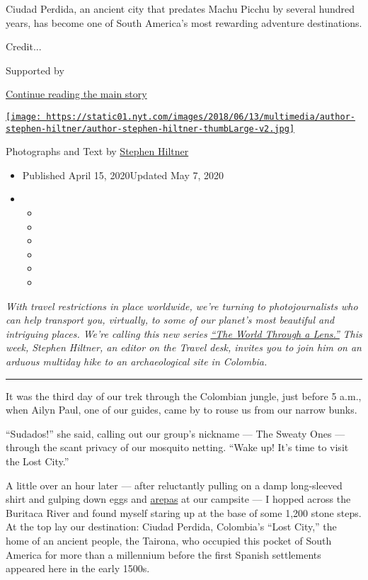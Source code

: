 Ciudad Perdida, an ancient city that predates Machu Picchu by several
hundred years, has become one of South America's most rewarding
adventure destinations.

Credit...

Supported by

\protect\hyperlink{after-sponsor}{Continue reading the main story}

\href{https://www.nytimes.com/by/stephen-hiltner}{\texttt{[image: https://static01.nyt.com/images/2018/06/13/multimedia/author-stephen-hiltner/author-stephen-hiltner-thumbLarge-v2.jpg]}}

Photographs and Text by
\href{https://www.nytimes.com/by/stephen-hiltner}{Stephen Hiltner}

\begin{itemize}
\item
  Published April 15, 2020Updated May 7, 2020
\item
  \begin{itemize}
  \item
  \item
  \item
  \item
  \item
  \item
  \end{itemize}
\end{itemize}

\emph{With travel restrictions in place worldwide, we're turning to
photojournalists who can help transport you, virtually, to some of our
planet's most beautiful and intriguing places. We're calling this new
series}
\href{https://www.nytimes.com/column/the-world-through-a-lens}{\emph{``The
World Through a Lens.''}} \emph{This week, Stephen Hiltner, an editor on
the Travel desk, invites you to join him on an arduous multiday hike to
an archaeological site in Colombia.}

\begin{center}\rule{0.5\linewidth}{\linethickness}\end{center}

It was the third day of our trek through the Colombian jungle, just
before 5 a.m., when Ailyn Paul, one of our guides, came by to rouse us
from our narrow bunks.

``Sudados!'' she said, calling out our group's nickname --- The Sweaty
Ones --- through the scant privacy of our mosquito netting. ``Wake up!
It's time to visit the Lost City.''

A little over an hour later --- after reluctantly pulling on a damp
long-sleeved shirt and gulping down eggs and
\href{https://cooking.nytimes.com/recipes/1015180-colombian-corn-and-cheese-arepas}{arepas}
at our campsite --- I hopped across the Buritaca River and found myself
staring up at the base of some 1,200 stone steps. At the top lay our
destination: Ciudad Perdida, Colombia's ``Lost City,'' the home of an
ancient people, the Tairona, who occupied this pocket of South America
for more than a millennium before the first Spanish settlements appeared
here in the early 1500s.

